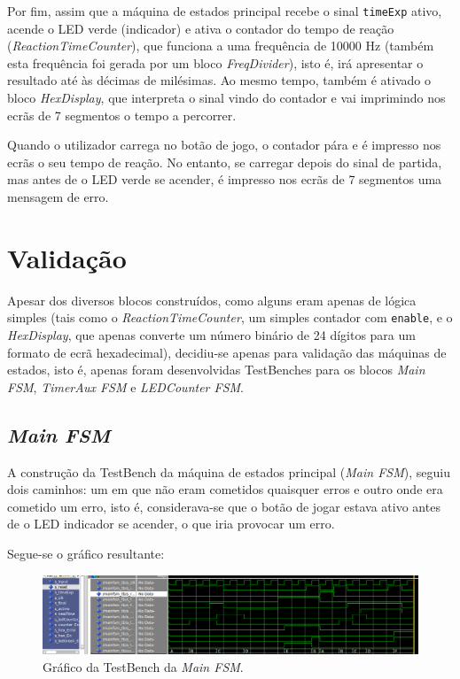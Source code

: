 \documentclass[a4paper,11pt,onecolumn]{report}
\begin{document}
Por fim, assim que a máquina de estados principal recebe o sinal \texttt{timeExp} ativo, acende o LED verde (indicador) e ativa o contador do tempo de reação (\textit{ReactionTimeCounter}), que funciona a uma frequência de 10000 Hz (também esta frequência foi gerada por um bloco \textit{FreqDivider}), isto é, irá apresentar o resultado até às décimas de milésimas. Ao mesmo tempo, também é ativado o bloco \textit{HexDisplay}, que interpreta o sinal vindo do contador e vai imprimindo nos ecrãs de 7 segmentos o tempo a percorrer.

Quando o utilizador carrega no botão de jogo, o contador pára e é impresso nos ecrãs o seu tempo de reação. No entanto, se carregar depois do sinal de partida, mas antes de o LED verde se acender, é impresso nos ecrãs de 7 segmentos uma mensagem de erro.

\section{Validação}

Apesar dos diversos blocos construídos, como alguns eram apenas de lógica simples (tais como o \textit{ReactionTimeCounter}, um simples contador com \texttt{enable}, e o \textit{HexDisplay}, que apenas converte um número binário de 24 dígitos para um formato de ecrã hexadecimal), decidiu-se apenas para validação das máquinas de estados, isto é, apenas foram desenvolvidas TestBenches para os blocos \textit{Main FSM}, \textit{TimerAux FSM} e \textit{LEDCounter FSM}.

\subsection{\textit{Main FSM}}
A construção da TestBench da máquina de estados principal (\textit{Main FSM}), seguiu dois caminhos: um em que não eram cometidos quaisquer erros e outro onde era cometido um erro, isto é, considerava-se que o botão de jogar estava ativo antes de o LED indicador se acender, o que iria provocar um erro.

Segue-se o gráfico resultante:

\begin{figure}[h]
\centerline{\includegraphics[scale=0.33]{Images/MainFSMTB}}
\caption{Gráfico da TestBench da \textit{Main FSM}.}
\label{figmainfsmtb}
\end{figure}
\end{document}
